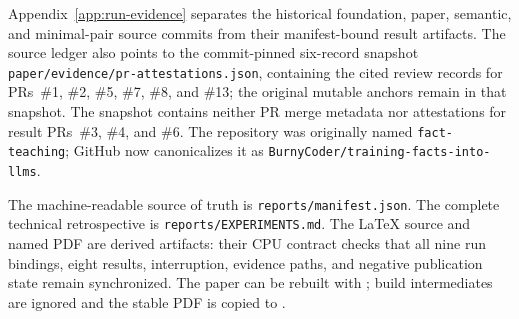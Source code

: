 Appendix~\ref{app:run-evidence} separates the historical foundation, paper,
semantic, and minimal-pair source commits from their manifest-bound result
artifacts. The source ledger also points to the commit-pinned six-record
snapshot \texttt{paper/evidence/pr-attestations.json}, containing the cited
review records for PRs~\#1, \#2, \#5, \#7, \#8, and \#13; the original
mutable anchors remain in that snapshot. The snapshot contains neither PR
merge metadata nor attestations for result PRs~\#3, \#4, and \#6.
The repository was originally named \texttt{fact-teaching}; GitHub now
canonicalizes it as \texttt{BurnyCoder/training-facts-into-llms}.
%

The machine-readable source of truth is
\texttt{reports/manifest.json}. The complete technical
retrospective is
\texttt{reports/EXPERIMENTS.md}. The LaTeX
source and named PDF are derived artifacts: their CPU contract checks that all
nine run bindings, eight results, interruption, evidence paths, and negative
publication state remain synchronized. The paper can be rebuilt with
; build intermediates are ignored and the stable PDF is
copied to .
